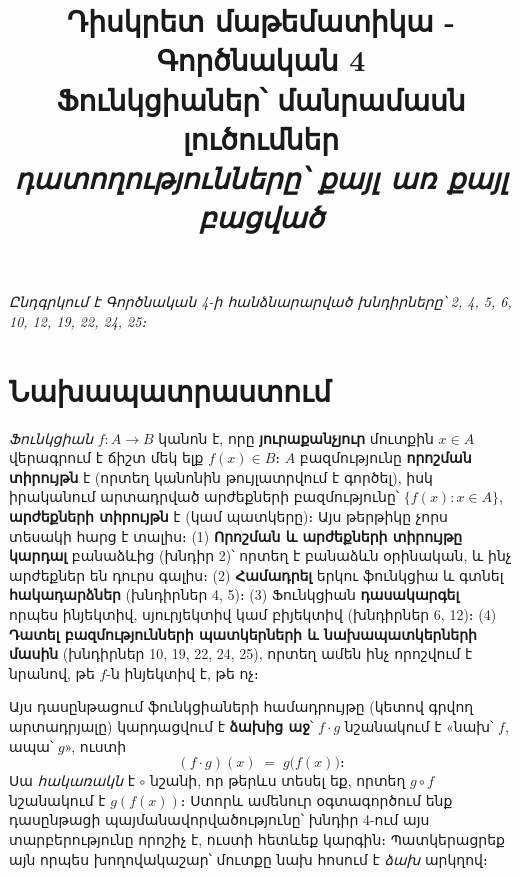 \documentclass[11pt,a4paper]{article}
\title{\vspace{-1.2cm}\textbf{Դիսկրետ մաթեմատիկա - Գործնական 4}\\[2pt]
\large Ֆունկցիաներ՝ մանրամասն լուծումներ\\[2pt]
\normalsize\itshape դատողությունները՝ քայլ առ քայլ բացված}
\author{}
\date{}
\begin{document}
\maketitle
\vspace{-1.0cm}

\begin{center}\small\itshape Ընդգրկում է Գործնական 4-ի հանձնարարված խնդիրները՝ 2, 4, 5, 6, 10, 12, 19, 22, 24, 25։\end{center}

\section*{Նախապատրաստում}

\emph{Ֆունկցիան} $f:A\to B$ կանոն է, որը \textbf{յուրաքանչյուր} մուտքին $x\in A$ վերագրում է ճիշտ
մեկ ելք $f(x)\in B$։ $A$ բազմությունը \textbf{որոշման տիրույթն} է (որտեղ կանոնին թույլատրվում է
գործել), իսկ իրականում արտադրված արժեքների բազմությունը՝ $\{f(x):x\in A\}$, \textbf{արժեքների
տիրույթն} է (կամ պատկերը)։ Այս թերթիկը չորս տեսակի հարց է տալիս։ (1) \textbf{Որոշման և արժեքների
տիրույթը կարդալ} բանաձևից (խնդիր 2)՝ որտեղ է բանաձևն օրինական, և ինչ արժեքներ են դուրս գալիս։
(2) \textbf{Համադրել} երկու ֆունկցիա և գտնել \textbf{հակադարձներ} (խնդիրներ 4, 5)։ (3) Ֆունկցիան
\textbf{դասակարգել} որպես ինյեկտիվ, սյուրյեկտիվ կամ բիյեկտիվ (խնդիրներ 6, 12)։ (4) \textbf{Դատել
բազմությունների պատկերների և նախապատկերների մասին} (խնդիրներ 10, 19, 22, 24, 25), որտեղ ամեն ինչ
որոշվում է նրանով, թե $f$-ն ինյեկտիվ է, թե ոչ։

\begin{tcolorbox}[colback=armRed!6,colframe=armRed!70!black,boxrule=0.8pt,arc=2mm,
  title={\bfseries Մի պայմանավորվածություն, որ պետք է ֆիքսել մյուս ամեն ինչից առաջ՝ համադրումը ձախից աջ է},
  fonttitle=\bfseries\color{white},coltitle=white]
Այս դասընթացում ֆունկցիաների համադրույթը (կետով գրվող արտադրյալը) կարդացվում է \textbf{ձախից աջ}՝ $f\cdot g$ նշանակում է
«նախ՝ $f$, ապա՝ $g$», ուստի
\[
  (f\cdot g)(x) \;=\; g\bigl(f(x)\bigr)։
\]
Սա \emph{հակառակն} է $\circ$ նշանի, որ թերևս տեսել եք, որտեղ $g\circ f$ նշանակում է
$g(f(x))$։ Ստորև ամենուր օգտագործում ենք դասընթացի պայմանավորվածությունը՝ խնդիր 4-ում այս
տարբերությունը որոշիչ է, ուստի հետևեք կարգին։ Պատկերացրեք այն որպես խողովակաշար՝ մուտքը նախ հոսում է
\emph{ձախ} արկղով։
\end{tcolorbox}

\begin{center}
\end{center}
\end{document}

